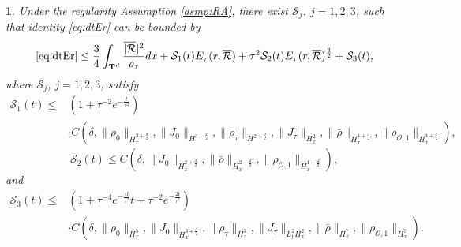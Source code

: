 \documentclass[english]{amsart}
\theoremstyle{plain}
\theoremstyle{definition}
\theoremstyle{remark}
\theoremstyle{plain}
\theoremstyle{plain}
\newtheorem{prop}[thm]{\protect\propositionname}
\theoremstyle{plain}
\providecommand{\propositionname}{Proposition}
\def\T{{\mathbf T}}%
\numberwithin{equation}{section}
\begin{document}
\begin{prop}
Under the regularity Assumption \ref{asmp:RA}, there exist $\mathcal{S}_j$, $j=1,2,3$, such that identity \eqref{eq:dtEr} can be bounded by
\begin{equation}\label{eq:estE}
\eqref{eq:dtEr}\leq \frac34\int_{\T^d} \frac{\overline{|\mathcal{R}}|^2}{\rho_\tau}dx+\mathcal{S}_1(t)E_\tau(r,\overline{\mathcal{R}})+\tau^2\mathcal{S}_2(t)E_\tau(r,\overline{\mathcal{R}})^\frac32+\mathcal{S}_3(t),
\end{equation}
where $\mathcal{S}_j$, $j=1,2,3$, satisfy
\begin{equation}\label{eq:prop8_1}
\begin{aligned}
\mathcal{S}_1(t)\leq  &(1+\tau^{-2}e^{-\frac{t}{\tau^2}})\\
&\cdot C(\delta,\|\rho_0\|_{H^{3+\frac{d}{2}}_x},\|J_0\|_{H^{3+\frac{d}{2}}},\|\rho_\tau\|_{H^{2+\frac{d}{2}}},\|J_\tau\|_{H^2_x},\|\bar \rho\|_{H^{4+\frac{d}{2}}_x},\|\rho_{\mathcal{O},1}\|_{H^{4+\frac{d}{2}}_x}),
\end{aligned}
\end{equation}
\begin{equation}\label{eq:prop8_2}
\mathcal{S}_2(t)\leq  C(\delta,\|J_0\|_{H^{2+\frac{d}{2}}_x},\|\bar\rho\|_{H^{2+\frac{d}{2}}_x},\|\rho_{\mathcal{O},1}\|_{H^{1+\frac{d}{2}}_x}),
\end{equation}
and
\begin{equation}\label{eq:prop8_3}
\begin{aligned}
\mathcal{S}_3(t)\leq & (1+\tau^{-4}e^{-\frac{4t}{\tau^2}}t+\tau^{-2}e^{-\frac{2t}{\tau^2}})\\
&\cdot C(\delta,\|\rho_0\|_{H^5_x},\|J_0\|_{H^{3+\frac{d}{2}}_x},\|\rho_\tau\|_{H^3_x},\|J_\tau\|_{L^2_tH^2_x},\|\bar\rho\|_{H^7_x},\|\rho_{\mathcal{O},1}\|_{H^7_x}).
\end{aligned}
\end{equation}
\end{prop}
\end{document}
